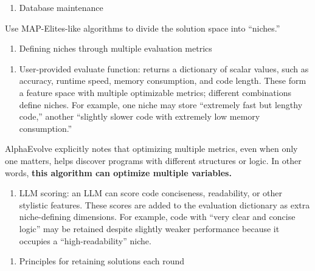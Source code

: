 \begin{enumerate}
\def\labelenumi{(\Roman{enumi})}
\setcounter{enumi}{2}
\tightlist
\item
  Database maintenance
\end{enumerate}

Use MAP-Elites-like algorithms to divide the solution space into ``niches.''

\begin{enumerate}
\def\labelenumi{\arabic{enumi}.}
\tightlist
\item
  Defining niches through multiple evaluation metrics
\end{enumerate}

\begin{enumerate}
\def\labelenumi{(\arabic{enumi})}
\tightlist
\item
  User-provided evaluate function: returns a dictionary of scalar values, such as accuracy, runtime speed, memory consumption, and code length. These form a feature space with multiple optimizable metrics; different combinations define niches. For example, one niche may store ``extremely fast but lengthy code,'' another ``slightly slower code with extremely low memory consumption.''
\end{enumerate}

AlphaEvolve explicitly notes that optimizing multiple metrics, even when only one matters, helps discover programs with different structures or logic. In other words, \textbf{this algorithm can optimize multiple variables.}

\begin{enumerate}
\def\labelenumi{(\arabic{enumi})}
\setcounter{enumi}{1}
\tightlist
\item
  LLM scoring: an LLM can score code conciseness, readability, or other stylistic features. These scores are added to the evaluation dictionary as extra niche-defining dimensions. For example, code with ``very clear and concise logic'' may be retained despite slightly weaker performance because it occupies a ``high-readability'' niche.
\end{enumerate}

\begin{enumerate}
\def\labelenumi{\arabic{enumi}.}
\setcounter{enumi}{1}
\tightlist
\item
  Principles for retaining solutions each round
\end{enumerate}

